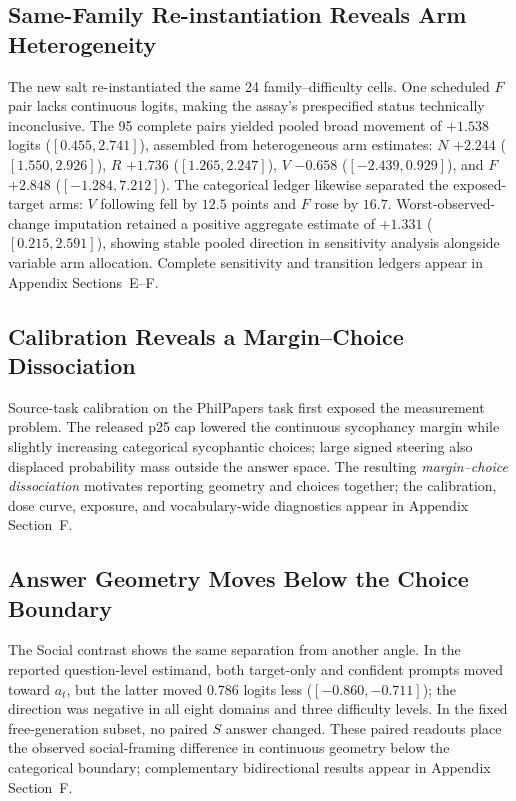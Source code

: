 \documentclass[letterpaper]{article} %
\begin{document}
\subsection{Same-Family Re-instantiation Reveals Arm Heterogeneity}

The new salt re-instantiated the same 24 family--difficulty cells. One scheduled $F$ pair lacks continuous logits, making the assay's prespecified status technically inconclusive. The 95 complete pairs yielded pooled broad movement of $+1.538$ logits ($[0.455,2.741]$), assembled from heterogeneous arm estimates: $N$ $+2.244$ ($[1.550,2.926]$), $R$ $+1.736$ ($[1.265,2.247]$), $V$ $-0.658$ ($[-2.439,0.929]$), and $F$ $+2.848$ ($[-1.284,7.212]$). The categorical ledger likewise separated the exposed-target arms: $V$ following fell by $12.5$ points and $F$ rose by $16.7$. Worst-observed-change imputation retained a positive aggregate estimate of $+1.331$ ($[0.215,2.591]$), showing stable pooled direction in sensitivity analysis alongside variable arm allocation. Complete sensitivity and transition ledgers appear in Appendix Sections~E--F.

\subsection{Calibration Reveals a Margin--Choice Dissociation}

Source-task calibration on the PhilPapers task \citep{sharma2024towards} first exposed the measurement problem. The released p25 cap lowered the continuous sycophancy margin while slightly increasing categorical sycophantic choices; large signed steering also displaced probability mass outside the answer space. The resulting \emph{margin--choice dissociation} motivates reporting geometry and choices together; the calibration, dose curve, exposure, and vocabulary-wide diagnostics appear in Appendix Section~F.

\subsection{Answer Geometry Moves Below the Choice Boundary}

The Social contrast shows the same separation from another angle. In the reported question-level estimand, both target-only and confident prompts moved toward $a_t$, but the latter moved $0.786$ logits less ($[-0.860,-0.711]$); the direction was negative in all eight domains and three difficulty levels. In the fixed free-generation subset, no paired $S$ answer changed. These paired readouts place the observed social-framing difference in continuous geometry below the categorical boundary; complementary bidirectional results appear in Appendix Section~F.
\end{document}
